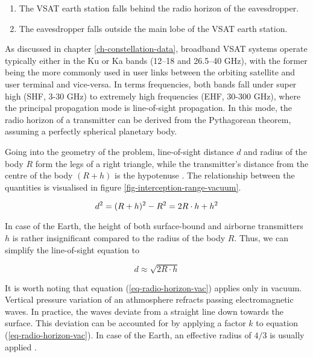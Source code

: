 \documentclass[english, 12pt, a4paper, elec, utf8, a-1b, online]{aaltothesis}
\begin{document}
\begin{enumerate}
  \item The VSAT earth station falls behind the radio horizon of the eavesdropper.
  \item The eavesdropper falls outside the main lobe of the VSAT earth station.
\end{enumerate}

As discussed in chapter \ref{ch-constellation-data}, broadband VSAT systems operate typically either in the Ku or Ka bands (12--18 and 26.5--40 GHz), with the former being the more commonly used in user links between the orbiting satellite and user terminal and vice-versa.
In terms frequencies, both bands fall under super high (SHF, 3-30 GHz) to extremely high frequencies (EHF, 30-300 GHz), where the principal propagation mode is line-of-sight propagation.
In this mode, the radio horizon of a transmitter can be derived from the Pythagorean theorem, assuming a perfectly spherical planetary body.

Going into the geometry of the problem, line-of-sight distance $d$ and radius of the body $R$ form the legs of a right triangle, while the transmitter's distance from the centre of the body $(R+h)$ is the hypotenuse \cite{seybold2005introduction}.
The relationship between the quantities is visualised in figure \ref{fig-interception-range-vacuum}.


\begin{equation*}
  d^2=(R+h)^{2}-R^2= 2R \cdot h + h^2 \\
\end{equation*}

In case of the Earth, the height of both surface-bound and airborne transmitters $h$ is rather insignificant compared to the radius of the body $R$. Thus, we can simplify the line-of-sight equation to

\begin{equation} \label{eq-radio-horizon-vac}
  d \approx \sqrt{2R \cdot h}
\end{equation}

It is worth noting that equation (\ref{eq-radio-horizon-vac}) applies only in vacuum.
Vertical pressure variation of an athmosphere refracts passing electromagnetic waves. In practice, the waves deviate from a straight line down towards the surface. This deviation can be accounted for by applying a factor $k$ to equation (\ref{eq-radio-horizon-vac}). In case of the Earth, an effective radius of $4/3$ is usually applied \cite{seybold2005introduction}.
\end{document}
